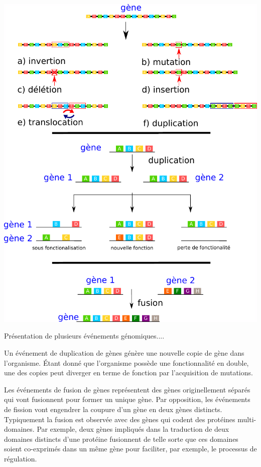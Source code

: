 \begin{refsegment}
    \begin{shadedfigure}[H]
        \centering
        \includegraphics[width=\textwidth]{img/gene_indel.pdf}
        \caption{Présentation de plusieurs événements génomiques....}
        \label{fig:/evenement_mutation}
    \end{shadedfigure}
    
    
    Un événement de duplication de gènes génère une nouvelle copie de gène dans l’organisme. Étant donné que l'organisme possède une fonctionnalité en double, une des copies peut diverger en terme de fonction par l’acquisition de mutations. 
    
    Les événements de fusion de gènes représentent des gènes originellement séparés qui vont fusionnent pour former un unique gène. Par opposition, les événements de fission vont  engendrer la coupure d’un gène en deux gènes distincts. Typiquement la fusion est observée avec des gènes qui codent des protéines multi-domaines. Par exemple, deux gènes impliqués dans la traduction de deux domaines distincts d'une protéine fusionnent de telle sorte que ces domaines soient co-exprimés dans un même gène pour faciliter, par exemple, le processus de régulation.
    

\end{refsegment}
